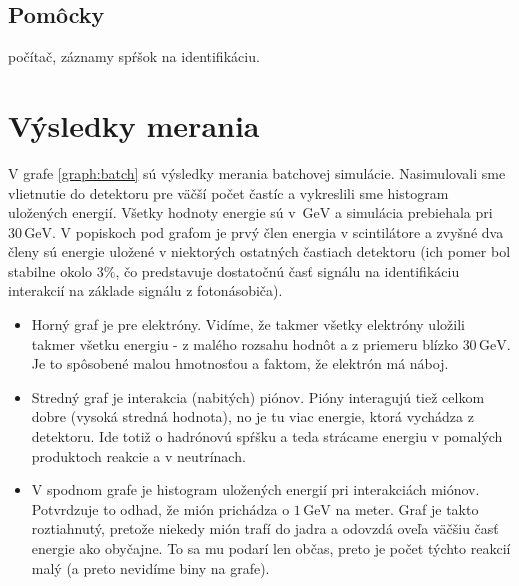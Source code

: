 \documentclass[a4paper, 10pt]{article}
\newcommand{\unit}[1]{\ensuremath{\, \mathrm{#1}}}
\begin{document}
\subsection*{Pomôcky}
počítač, záznamy spŕšok na identifikáciu.
\section*{Výsledky merania}
V grafe \ref{graph:batch} sú výsledky merania batchovej simulácie. Nasimulovali sme vlietnutie do detektoru pre väčší počet častíc a vykreslili sme histogram uložených energií. Všetky hodnoty energie sú v $\unit{GeV}$ a simulácia prebiehala pri $30\unit{GeV}$. V popiskoch pod grafom je prvý člen energia v scintilátore a zvyšné dva členy sú energie uložené v niektorých ostatných častiach detektoru (ich pomer bol stabilne okolo $3\%$, čo predstavuje dostatočnú časť signálu na identifikáciu interakcií na základe signálu z fotonásobiča). 

\begin{itemize}
\item Horný graf je pre elektróny. Vidíme, že takmer všetky elektróny uložili takmer všetku energiu - z malého rozsahu hodnôt a z priemeru blízko $30\unit{GeV}$. Je to spôsobené malou hmotnosťou a faktom, že elektrón má náboj.

\item Stredný graf je interakcia (nabitých) piónov. Pióny interagujú tiež celkom dobre (vysoká stredná hodnota), no  je tu viac energie, ktorá vychádza z detektoru. Ide totiž o hadrónovú spŕšku a teda strácame energiu v pomalých produktoch reakcie a v neutrínach.

\item V spodnom grafe je histogram uložených energií pri interakciách miónov. Potvrdzuje to odhad, že mión prichádza o $1 \unit{GeV}$ na meter. Graf je takto roztiahnutý, pretože niekedy mión trafí do jadra a odovzdá oveľa väčšiu časť energie ako obyčajne. To sa mu podarí len občas, preto je počet týchto reakcií malý (a preto nevidíme biny na grafe).
\end{itemize}
\end{document}
